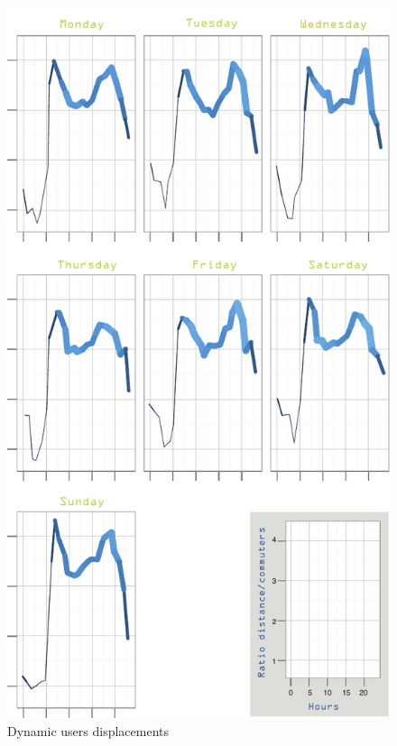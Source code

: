\begin{figure}[h]
\begin{center}
\includegraphics[scale = 1.0] {results/images/commuting_results.pdf}
\caption{Dynamic users displacements}
\label{fig:dynamic_displacements}
\end{center}
\end{figure}
